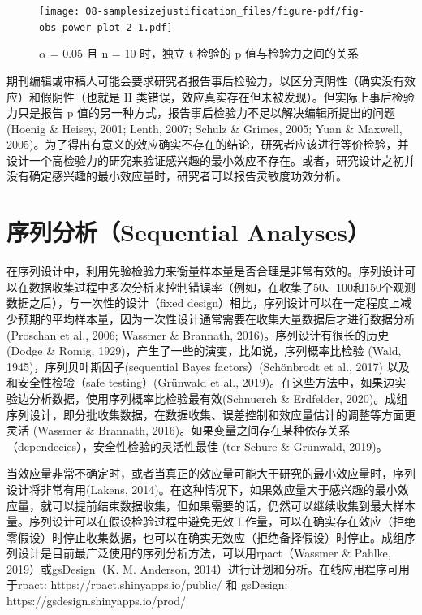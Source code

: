 \documentclass[
  letterpaper,
  DIV=11,
  numbers=noendperiod]{scrreprt}
\begin{document}
\begin{figure}

{\centering \texttt{[image: 08-samplesizejustification\_files/figure-pdf/fig-obs-power-plot-2-1.pdf]}

}

\caption{\label{fig-obs-power-plot-2}\(\alpha\) = 0.05 且 n = 10
时，独立 t 检验的 p 值与检验力之间的关系}

\end{figure}

期刊编辑或审稿人可能会要求研究者报告事后检验力，以区分真阴性（确实没有效应）和假阴性（也就是
II 类错误，效应真实存在但未被发现）。但实际上事后检验力只是报告 p
值的另一种方式，报告事后检验力不足以解决编辑所提出的问题(Hoenig \&
Heisey, 2001; Lenth, 2007; Schulz \& Grimes, 2005; Yuan \& Maxwell,
2005)。为了得出有意义的效应确实不存在的结论，研究者应该进行等价检验，并设计一个高检验力的研究来验证感兴趣的最小效应不存在。或者，研究设计之初并没有确定感兴趣的最小效应量时，研究者可以报告灵敏度功效分析。

\hypertarget{sec-sequentialsamplesize}{%
\section{序列分析（Sequential
Analyses）}\label{sec-sequentialsamplesize}}

在序列设计中，利用先验检验力来衡量样本量是否合理是非常有效的。序列设计可以在数据收集过程中多次分析来控制错误率（例如，在收集了50、100和150个观测数据之后），与一次性的设计（fixed
design）相比，序列设计可以在一定程度上减少预期的平均样本量，因为一次性设计通常需要在收集大量数据后才进行数据分析(Proschan
et al., 2006; Wassmer \& Brannath, 2016)。序列设计有很长的历史(Dodge \&
Romig, 1929)，产生了一些的演变，比如说，序列概率比检验 (Wald,
1945)，序列贝叶斯因子(sequential Bayes factors）(Schönbrodt et al.,
2017) 以及和安全性检验（safe testing）(Grünwald et al.,
2019)。在这些方法中，如果边实验边分析数据，使用序列概率比检验最有效(Schnuerch
\& Erdfelder,
2020)。成组序列设计，即分批收集数据，在数据收集、误差控制和效应量估计的调整等方面更灵活
(Wassmer \& Brannath,
2016)。如果变量之间存在某种依存关系（dependecies），安全性检验的灵活性最佳
(ter Schure \& Grünwald, 2019)。

当效应量非常不确定时，或者当真正的效应量可能大于研究的最小效应量时，序列设计将非常有用(Lakens,
2014)。在这种情况下，如果效应量大于感兴趣的最小效应量，就可以提前结束数据收集，但如果需要的话，仍然可以继续收集到最大样本量。序列设计可以在假设检验过程中避免无效工作量，可以在确实存在效应（拒绝零假设）时停止收集数据，也可以在确实无效应（拒绝备择假设）时停止。成组序列设计是目前最广泛使用的序列分析方法，可以用rpact（Wassmer
\& Pahlke, 2019）或gsDesign（K. M. Anderson,
2014）进行计划和分析。在线应用程序可用于rpact:
https://rpact.shinyapps.io/public/ 和 gsDesign:
https://gsdesign.shinyapps.io/prod/
\end{document}
